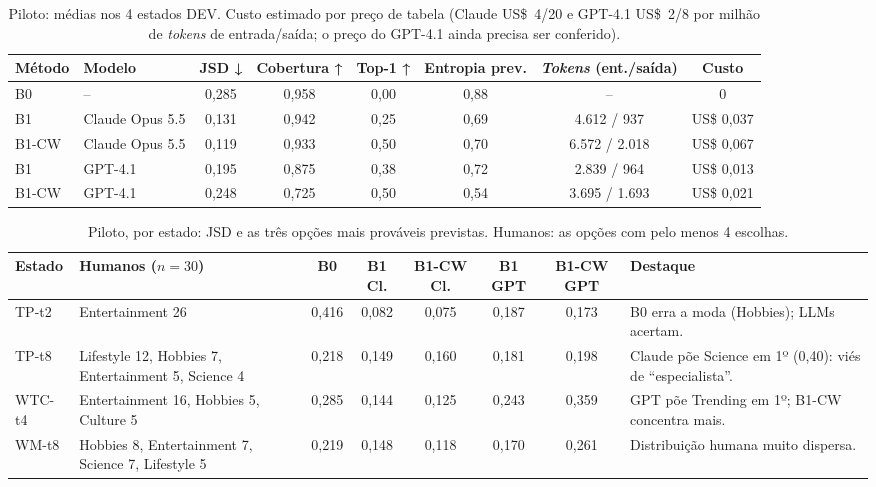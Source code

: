 \documentclass[12pt]{article}
\begin{document}
\begin{table}[ht]
\centering
\caption{Piloto: médias nos 4 estados DEV. Custo estimado por preço de tabela (Claude US\$~4/20 e GPT-4.1 US\$~2/8 por milhão de \textit{tokens} de entrada/saída; o preço do GPT-4.1 ainda precisa ser conferido).}
\label{tab:piloto}
\scriptsize
\begin{tabular}{@{}llcccccc@{}}
\toprule
\textbf{Método} & \textbf{Modelo} & \textbf{JSD ↓} & \textbf{Cobertura ↑} & \textbf{Top-1 ↑} & \textbf{Entropia prev.} & \textbf{\textit{Tokens} (ent./saída)} & \textbf{Custo} \\
\midrule
B0 & -- & 0,285 & 0,958 & 0,00 & 0,88 & -- & 0 \\
B1 & Claude Opus 5.5 & 0,131 & 0,942 & 0,25 & 0,69 & 4.612 / 937 & US\$ 0,037 \\
B1-CW & Claude Opus 5.5 & 0,119 & 0,933 & 0,50 & 0,70 & 6.572 / 2.018 & US\$ 0,067 \\
B1 & GPT-4.1 & 0,195 & 0,875 & 0,38 & 0,72 & 2.839 / 964 & US\$ 0,013 \\
B1-CW & GPT-4.1 & 0,248 & 0,725 & 0,50 & 0,54 & 3.695 / 1.693 & US\$ 0,021 \\
\bottomrule
\end{tabular}
\end{table}

\begin{table}[ht]
\centering
\caption{Piloto, por estado: JSD e as três opções mais prováveis previstas. Humanos: as opções com pelo menos 4 escolhas.}
\label{tab:pilotoestados}
\scriptsize
\begin{tabularx}{\textwidth}{@{}p{1.3cm}p{2.9cm}cccccY@{}}
\toprule
\textbf{Estado} & \textbf{Humanos ($n=30$)} & \textbf{B0} & \textbf{B1 Cl.} & \textbf{B1-CW Cl.} & \textbf{B1 GPT} & \textbf{B1-CW GPT} & \textbf{Destaque} \\
\midrule
TP-t2 & Entertainment 26 & 0,416 & 0,082 & 0,075 & 0,187 & 0,173 & B0 erra a moda (Hobbies); LLMs acertam. \\
TP-t8 & Lifestyle 12, Hobbies 7, Entertainment 5, Science 4 & 0,218 & 0,149 & 0,160 & 0,181 & 0,198 & Claude põe Science em 1º (0,40): viés de ``especialista''. \\
WTC-t4 & Entertainment 16, Hobbies 5, Culture 5 & 0,285 & 0,144 & 0,125 & 0,243 & 0,359 & GPT põe Trending em 1º; B1-CW concentra mais. \\
WM-t8 & Hobbies 8, Entertainment 7, Science 7, Lifestyle 5 & 0,219 & 0,148 & 0,118 & 0,170 & 0,261 & Distribuição humana muito dispersa. \\
\bottomrule
\end{tabularx}
\end{table}
\end{document}
